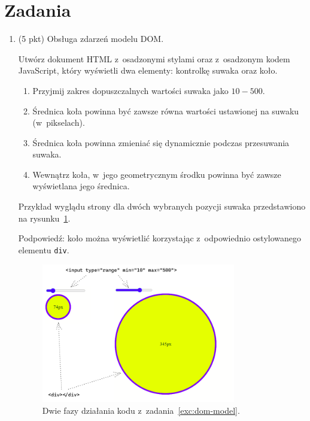 \documentclass[12pt]{article}
\begin{document}
    \section*{Zadania}
        \begin{enumerate}
        \item\label{exc:dom-model}
            (5 pkt) Obsługa zdarzeń modelu DOM.

            Utwórz dokument HTML z~osadzonymi stylami oraz z~osadzonym kodem JavaScript, który wyświetli dwa elementy: kontrolkę suwaka oraz koło.

            \begin{enumerate}
                \item Przyjmij zakres dopuszczalnych wartości suwaka jako $10 - 500$.
                \item Średnica koła powinna być zawsze równa wartości ustawionej na suwaku (w~pikselach).
                \item Średnica koła powinna zmieniać się dynamicznie podczas przesuwania suwaka.
                \item Wewnątrz koła, w~jego geometrycznym środku powinna być zawsze wyświetlana jego średnica.
            \end{enumerate}


            Przykład wyglądu strony dla dwóch wybranych pozycji suwaka przedstawiono na rysunku~\ref{fig:dom-model}.

            Podpowiedź: koło można wyświetlić korzystając z~odpowiednio ostylowanego elementu \texttt{div}.

            \begin{figure}[p]
                \centering
                \includegraphics[width=0.8\textwidth]{lista-2-1}
                \caption{Dwie fazy działania kodu z~zadania~\ref{exc:dom-model}.}
                \label{fig:dom-model}
            \end{figure}


\end{enumerate}
\end{document}
